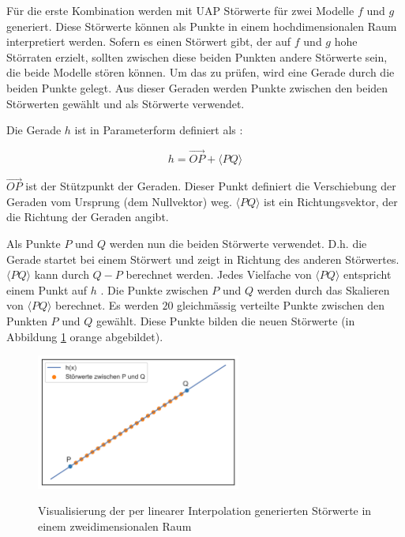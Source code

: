\documentclass{FFHS_Thesis_Additions/ffhsthesis}
\begin{document}
Für die erste Kombination werden mit UAP Störwerte für zwei Modelle $f$ und $g$ generiert. 
Diese Störwerte können als Punkte in einem hochdimensionalen Raum interpretiert werden. 
Sofern es einen Störwert gibt, der auf $f$ und $g$ hohe Störraten erzielt, sollten zwischen diese beiden Punkten andere Störwerte sein, die beide Modelle stören können. 
Um das zu prüfen, wird eine Gerade durch die beiden Punkte gelegt. 
Aus dieser Geraden werden Punkte zwischen den beiden Störwerten gewählt und als Störwerte verwendet.

Die Gerade $h$ ist in Parameterform definiert als \cite{rolf_socher_mathematik_2011}:

\[
h = \vec{OP} + \langle  PQ \rangle 
\]

$\vec{OP}$ ist der Stützpunkt der Geraden. 
Dieser Punkt definiert die Verschiebung der Geraden vom Ursprung (dem Nullvektor) weg. 
$\langle PQ \rangle $ ist ein Richtungsvektor, der die Richtung der Geraden angibt.

\pagebreak

Als Punkte $P$ und $Q$ werden nun die beiden Störwerte verwendet. 
D.h. die Gerade startet bei einem Störwert und zeigt in Richtung des anderen Störwertes. 
$\langle PQ \rangle $ kann durch $Q-P$ berechnet werden. 
Jedes Vielfache von $\langle PQ \rangle $ entspricht einem Punkt auf $h$ \cite{rolf_socher_mathematik_2011}. 
Die Punkte zwischen $P$ und $Q$ werden durch das Skalieren von $\langle PQ \rangle $ berechnet. 
Es werden $20$ gleichmässig verteilte Punkte zwischen den Punkten $P$ und $Q$ gewählt. 
Diese Punkte bilden die neuen Störwerte (in Abbildung \ref{fig_interpolation_example} orange abgebildet).

\begin{figure}[h]
\caption{Visualisierung der per linearer Interpolation generierten Störwerte in einem zweidimensionalen Raum}
\centering
\includegraphics[width=0.6\textwidth]{./images/lin_interpol_example}
\label{fig_interpolation_example}
\end{figure}
\end{document}
